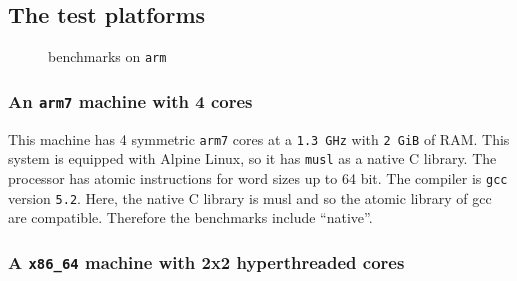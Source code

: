 \subsection{The test platforms}
\label{sec-4-3}
\begin{figure}[t]
  \caption{benchmarks on \texttt{arm}}
  \label{fig:arm}
\end{figure}
\subsubsection{An \texttt{arm7} machine with 4 cores}
\label{sec-4-3-1}

This machine has 4 symmetric \texttt{arm7} cores at a \texttt{1.3 GHz} with \texttt{2
    GiB} of RAM. This system is equipped with Alpine Linux, so it has
\texttt{musl} as a native C library. The processor has atomic
instructions for word sizes up to 64 bit. The compiler is \texttt{gcc}
version \texttt{5.2}.
%
Here, the native C library is musl and so the atomic library of gcc are
compatible. Therefore the benchmarks include ``native''.


\subsubsection{A \texttt{x86\_64} machine with 2x2 hyperthreaded cores}
\label{sec-4-3-2}

